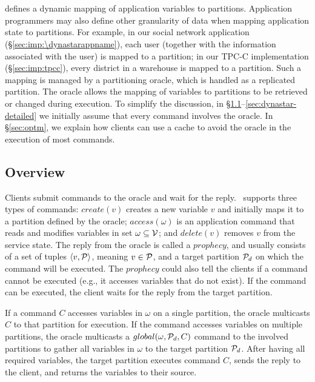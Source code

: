 \section{\dynastar}
\label{sec:dynastar-algo}

\dynastar defines a dynamic mapping of application variables to partitions.
Application programmers may also define other granularity of data when mapping
application state to partitions. For example, in our social network application
(\S\ref{sec:imp:\dynastarappname}), each user (together with the information associated
with the user) is mapped to a partition; in our TPC-C implementation
(\S\ref{sec:imp:tpcc}), every district in a warehouse is mapped to a partition.
Such a mapping is managed by a partitioning oracle, which is handled as a
replicated partition. The oracle allows the mapping of variables to partitions
to be retrieved or changed during execution. To simplify the discussion, in
\S\ref{sec:dynastar-overview}--\ref{sec:dynastar-detailed} we initially assume
that every command involves the oracle. In \S\ref{sec:optm}, we explain how
clients can use a cache to avoid the oracle in the execution of most commands.

\subsection{Overview}
\label{sec:dynastar-overview}

Clients submit commands to the oracle and wait for the reply. \dynastar\
supports three types of commands: $create(v)$ creates a new variable $v$ and
initially maps it to a partition defined by the oracle; $access(\omega)$ is an
application command that reads and modifies variables in set $\omega \subseteq
\mathcal{V}$; and $delete(v)$ removes $v$ from the service state. The reply from the
oracle is called a $prophecy$, and usually consists of a set of tuples $\langle
v, \mathcal{P} \rangle$, meaning $v \in \mathcal{P}$, and a target partition $\mathcal{P}_d$ on which
the command will be executed. The $prophecy$ could also tell the clients if a
command cannot be executed (e.g., it accesses variables that do not exist). If
the command can be executed, the client waits for the reply from the target
partition.

If a command $C$ accesses variables in $\omega$ on a single partition, the
oracle multicasts $C$ to that partition for execution. If the command accesses
variables on multiple partitions, the oracle multicasts a $global(\omega,\mathcal{P}_d,
C)$ command to the involved partitions to gather all variables in $\omega$ to
the target partition $\mathcal{P}_d$. After having all required variables, the target
partition executes command $C$, sends the reply to the client, and returns the
variables to their source.

